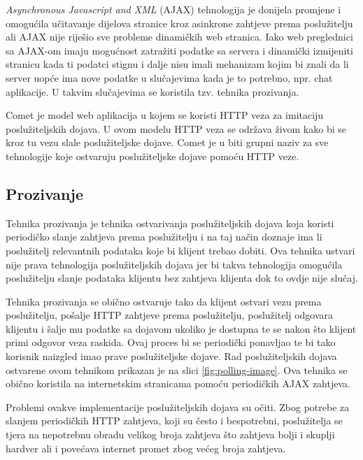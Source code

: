\documentclass[times, utf8, zavrsni]{fer}
\begin{document}
{\em Asynchronous Javascript and XML} (AJAX) tehnologija je donijela promjene i omogućila učitavanje dijelova stranice kroz asinkrone zahtjeve prema poslužitelju ali AJAX nije riješio sve probleme dinamičkih web stranica. Iako web preglednici sa AJAX-om imaju mogućnost zatražiti podatke sa servera i dinamički izmijeniti stranicu kada ti podatci stignu i dalje nisu imali mehanizam kojim bi znali da li server uopće ima nove podatke u slučajevima kada je to potrebno, npr. chat aplikacije. U takvim slučajevima se koristila tzv. tehnika prozivanja.\citep{gravelle2009comet}

Comet je model web aplikacija u kojem se koristi HTTP veza za imitaciju poslužiteljskih dojava. U ovom modelu HTTP veza se održava živom kako bi se kroz tu vezu slale poslužiteljske dojave. Comet je u biti grupni naziv za sve tehnologije koje ostvaruju poslužiteljske dojave pomoću HTTP veze.

\subsection{Prozivanje}
Tehnika prozivanja  je tehnika ostvarivanja poslužiteljskih dojava koja koristi periodičko slanje zahtjeva prema poslužitelju i na taj način doznaje ima li poslužitelj relevantnih podataka koje bi klijent trebao dobiti. Ova tehnika ustvari nije prava tehnologija poslužiteljskih dojava jer bi takva tehnologija omogućila poslužitelju slanje podataka klijentu bez zahtjeva klijenta dok to ovdje nije slučaj.

Tehnika prozivanja se obično ostvaruje tako da klijent ostvari vezu prema poslužitelju, pošalje HTTP zahtjeve prema poslužitelju, poslužitelj odgovara klijentu i šalje mu podatke sa dojavom ukoliko je dostupna te se nakon što klijent primi odgovor veza raskida. Ovaj proces bi se periodički ponavljao te bi tako korisnik naizgled imao prave poslužiteljske dojave. Rad poslužiteljskih dojava ostvarene ovom tehnikom prikazan je na slici \ref{fig:polling-image}. Ova tehnika se obično koristila na internetskim stranicama pomoću periodičkih AJAX zahtjeva. 

Problemi ovakve implementacije poslužiteljskih dojava su očiti. Zbog potrebe za slanjem periodičkih HTTP zahtjeva, koji su često i bespotrebni, poslužitelja se tjera na nepotrebnu obradu velikog broja zahtjeva što zahtjeva bolji i skuplji hardver ali i povećava internet promet zbog većeg broja zahtjeva.
\end{document}
